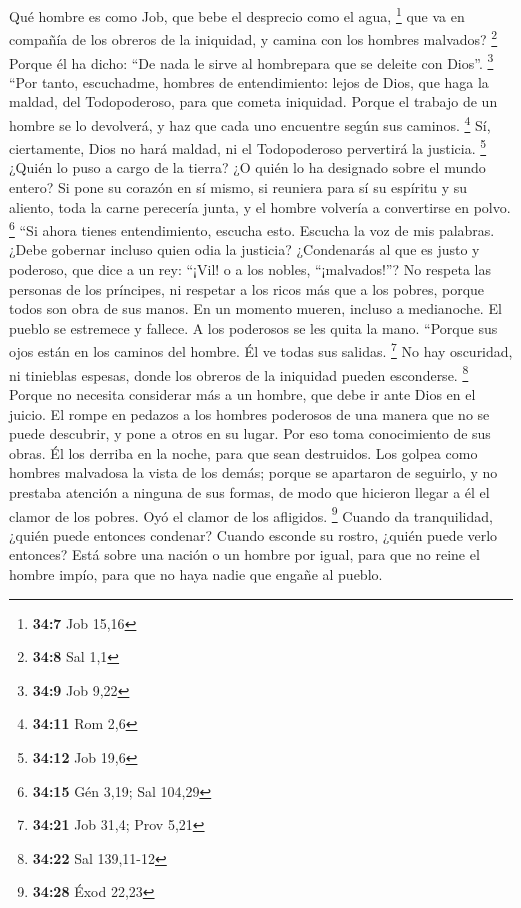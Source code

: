  Qué hombre es como Job, que bebe el desprecio como el
agua, \footnote{\textbf{34:7} Job 15,16}  que va en
compañía de los obreros de la iniquidad, y camina con los hombres
malvados? \footnote{\textbf{34:8} Sal 1,1}  Porque él ha
dicho: ``De nada le sirve al hombrepara que se deleite con Dios''.
\footnote{\textbf{34:9} Job 9,22}  ``Por tanto,
escuchadme, hombres de entendimiento: lejos de Dios, que haga la maldad,
del Todopoderoso, para que cometa iniquidad.  Porque el
trabajo de un hombre se lo devolverá, y haz que cada uno encuentre según
sus caminos. \footnote{\textbf{34:11} Rom 2,6}  Sí,
ciertamente, Dios no hará maldad, ni el Todopoderoso pervertirá la
justicia. \footnote{\textbf{34:12} Job 19,6}  ¿Quién lo
puso a cargo de la tierra? ¿O quién lo ha designado sobre el mundo
entero?  Si pone su corazón en sí mismo, si reuniera para
sí su espíritu y su aliento,  toda la carne perecería
junta, y el hombre volvería a convertirse en polvo. \footnote{\textbf{34:15}
  Gén 3,19; Sal 104,29}  ``Si ahora tienes entendimiento,
escucha esto. Escucha la voz de mis palabras.  ¿Debe
gobernar incluso quien odia la justicia? ¿Condenarás al que es justo y
poderoso,  que dice a un rey: ``¡Vil! o a los nobles,
``¡malvados!''?  No respeta las personas de los
príncipes, ni respetar a los ricos más que a los pobres, porque todos
son obra de sus manos.  En un momento mueren, incluso a
medianoche. El pueblo se estremece y fallece. A los poderosos se les
quita la mano.  ``Porque sus ojos están en los caminos
del hombre. Él ve todas sus salidas. \footnote{\textbf{34:21} Job 31,4;
  Prov 5,21}  No hay oscuridad, ni tinieblas espesas,
donde los obreros de la iniquidad pueden esconderse. \footnote{\textbf{34:22}
  Sal 139,11-12}  Porque no necesita considerar más a un
hombre, que debe ir ante Dios en el juicio.  El rompe en
pedazos a los hombres poderosos de una manera que no se puede descubrir,
y pone a otros en su lugar.  Por eso toma conocimiento de
sus obras. Él los derriba en la noche, para que sean destruidos.
 Los golpea como hombres malvadosa la vista de los demás;
 porque se apartaron de seguirlo, y no prestaba atención
a ninguna de sus formas,  de modo que hicieron llegar a
él el clamor de los pobres. Oyó el clamor de los afligidos. \footnote{\textbf{34:28}
  Éxod 22,23}  Cuando da tranquilidad, ¿quién puede
entonces condenar? Cuando esconde su rostro, ¿quién puede verlo
entonces? Está sobre una nación o un hombre por igual, 
para que no reine el hombre impío, para que no haya nadie que engañe al
pueblo.

